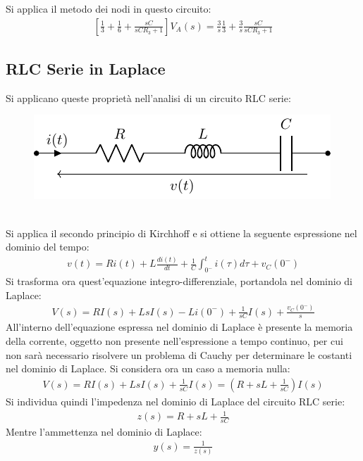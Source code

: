 \documentclass{article}
\numberwithin{equation}{subsection}
\begin{document}
Si applica il metodo dei nodi in questo circuito:
\begin{gather*}
    \left[\displaystyle\frac{1}{3}+\frac{1}{6}+\frac{sC}{sC R_3+1}\right]V_A(s)=\frac{3}{s}\frac{1}{3}+\frac{3}{s}\frac{sC}{sCR_3+1}
\end{gather*}

\subsection{RLC Serie in Laplace}

Si applicano queste proprietà nell'analisi di un circuito RLC serie:
\begin{figure}[ht]%
    \centering
    \includegraphics{serie-circuito-rlc-serie.pdf}
    \label{fig:serie-circuito-rlc-serie}
\end{figure}
\\
Si applica il secondo principio di Kirchhoff e si ottiene la seguente espressione nel dominio del tempo:
\begin{gather*}
    v(t)=Ri(t)+L\displaystyle\frac{di(t)}{dt}+\frac{1}{C}\int_{0^-}^ti(\tau)d\tau+v_C(0^-)
\end{gather*}
Si trasforma ora quest'equazione integro-differenziale, portandola nel dominio di Laplace:
\begin{gather*}
    V(s)=RI(s)+LsI(s)-Li(0^-)+\displaystyle\frac{1}{sC}I(s)+\frac{v_C(0^-)}{s}
\end{gather*}
All'interno dell'equazione espressa nel dominio di Laplace è presente la memoria della corrente, oggetto non presente nell'espressione a tempo continuo, per cui non sarà 
necessario risolvere un problema di Cauchy per determinare le costanti nel dominio di Laplace. Si considera ora un caso a memoria nulla:
\begin{gather*}
    V(s)=RI(s)+LsI(s)+\displaystyle\frac{1}{sC}I(s)=\left(R+sL+\frac{1}{sC}\right)I(s)
\end{gather*}
Si individua quindi l'impedenza nel dominio di Laplace del circuito RLC serie:
\begin{gather*}
    z(s)=R+sL+\displaystyle\frac{1}{sC}
\end{gather*}
Mentre l'ammettenza nel dominio di Laplace:
\begin{gather*}
    y(s)=\displaystyle\frac{1}{z(s)}
\end{gather*} 
\end{document}
